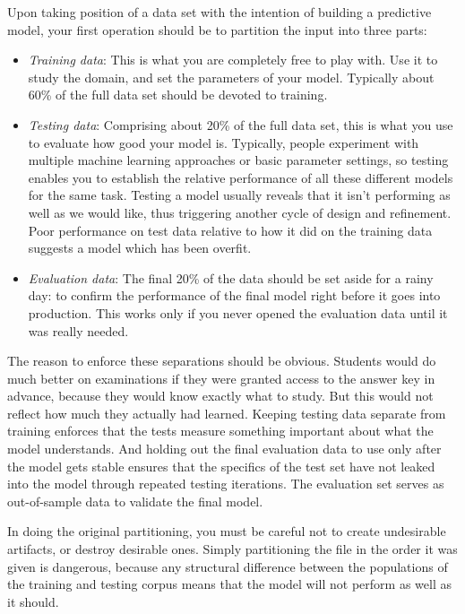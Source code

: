 \documentclass[10pt]{article}
\begin{document}
Upon taking position of a data set with the intention of building a predictive model, your first operation should be to partition the input into three parts:
\begin{itemize}
  \item \textit{Training data}: This is what you are completely free to play with. Use it to study the domain, and set the parameters of your model. Typically about 60\% of the full data set should be devoted to training.
  \item \textit{Testing data}: Comprising about 20\% of the full data set, this is what you use to evaluate how good your model is. Typically, people experiment with multiple machine learning approaches or basic parameter settings, so testing enables you to establish the relative performance of all these different models for the same task. Testing a model usually reveals that it isn't performing as well as we would like, thus triggering another cycle of design and refinement. Poor performance on test data relative to how it did on the training data suggests a model which has been overfit.
  \item \textit{Evaluation data}: The final 20\% of the data should be set aside for a rainy day: to confirm the performance of the final model right before it goes into production. This works only if you never opened the evaluation data until it was really needed.
\end{itemize}

The reason to enforce these separations should be obvious. Students would do much better on examinations if they were granted access to the answer key in advance, because they would know exactly what to study. But this would not reflect how much they actually had learned. Keeping testing data separate from training enforces that the tests measure something important about what the model understands. And holding out the final evaluation data to use only after the model gets stable ensures that the specifics of the test set have not leaked into the model through repeated testing iterations. The evaluation set serves as out-of-sample data to validate the final model.

In doing the original partitioning, you must be careful not to create undesirable artifacts, or destroy desirable ones. Simply partitioning the file in the order it was given is dangerous, because any structural difference between the populations of the training and testing corpus means that the model will not perform as well as it should.
\end{document}
